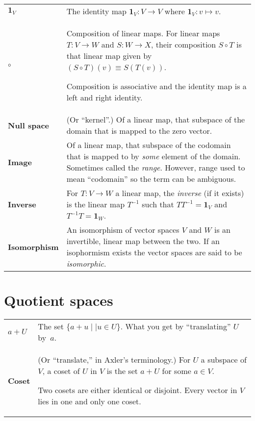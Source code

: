 \documentclass[10pt, a4paper, landscape]{article}
\newcommand{\defn}[1]{\textbf{#1}}
\newcommand{\id}{\mathbold{1}}
\begin{document}
\begin{multicols*}{3}
\begin{tabularx}{\columnwidth}{@{}l>{\raggedright\arraybackslash}X@{}}
  $\id_V$ & The identity map $\id_V\colon V\to V$ where $\id_V\colon v\mapsto v$. \\

  $\circ$ & Composition of linear maps. For linear maps $T\colon V\to W$ and $S\colon W\to X$, their composition $S\circ T$ is that linear map given by $(S\circ T)(v) \equiv S(T(v))$.

  Composition is associative and the identity map is a left and right
  identity. \\

  \defn{Null space} & (Or “kernel”.) Of a linear map, that subspace of the domain that is mapped to the zero vector. \\

  \defn{Image} & Of a linear map, that subspace of the codomain that is mapped to by \emph{some} element of the domain. Sometimes called the \emph{range}. However, range used to mean “codomain” so the term can be ambiguous. \\

  \defn{Inverse} & For $T:V\to W$ a linear map, the \emph{inverse} (if it
  exists) is the linear map $T^{-1}$ such that $TT^{-1}=\id_V$ and $T^{-1}T=\id_W$. \\

  \defn{Isomorphism} & An isomorphism of vector spaces $V$ and $W$ is an invertible, linear map between the two. If an isophormism exists the vector spaces are said to be \emph{isomorphic}. 
  
\end{tabularx}


\section*{Quotient spaces}
\begin{tabularx}{\columnwidth}{@{}l>{\raggedright\arraybackslash}X@{}}
  \toprule
  \defn{$a+U$} & The set $\{a+u\mid \mid u\in U\}$. What you get by “translating” $U$ by~$a$.  \\ 

  \defn{Coset} & (Or “translate,” in Axler's terminology.) For $U$ a
  subspace of $V$, a coset of $U$ in $V$ is the set $a+U$ for some $a\in V$.

  Two cosets are either identical or disjoint. Every vector in $V$ lies
  in one and only one coset.  \\


\end{tabularx}
\end{multicols*}
\end{document}
